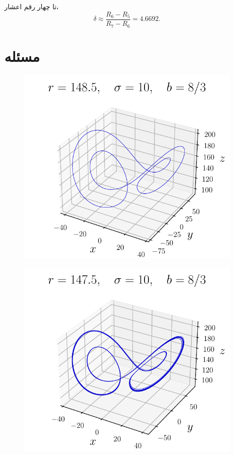 \documentclass[12pt,a4paper]{article}
\begin{document}
	\subsection{}
	تا چهار رقم اعشار،
	\begin{equation}
		\delta \approx \frac{R_6 - R_5}{R_7 - R_6} = 4.6692.
	\end{equation}

	\section{مسئله }
	\begin{figure}[h!]
		\centering
		\includegraphics[width=0.7\linewidth]{fig/10.4.9.single.3d}
	\end{figure}
	\begin{figure}[h!]
		\centering
		\includegraphics[width=0.7\linewidth]{fig/10.4.9.double.3d}
	\end{figure}
\end{document}
